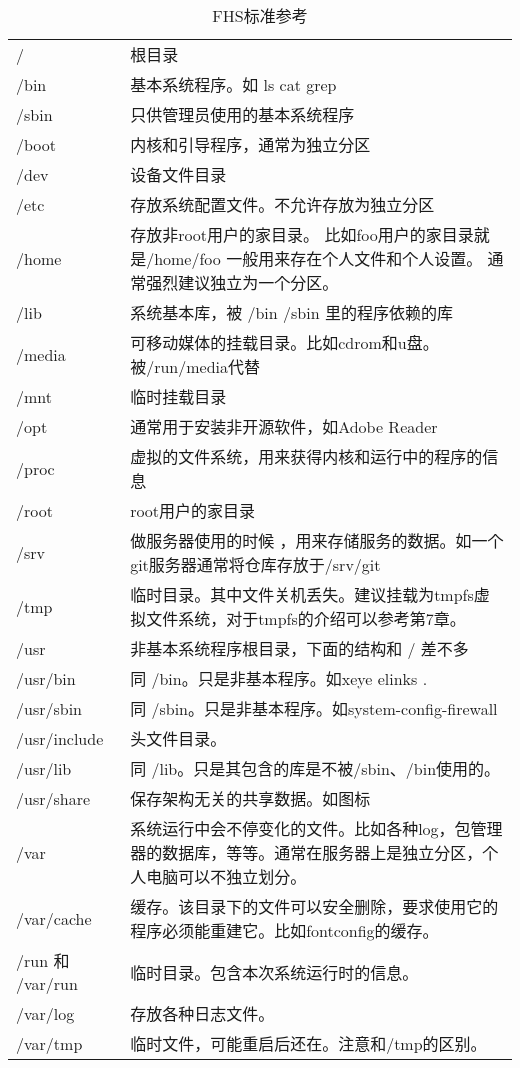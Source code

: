 \documentclass[amstex,twoside]{ctexbook}
\begin{document}
\begin{longtable}{|l|p{}|}\hline
\caption{FHS标准参考}\\
\hline
/ & 根目录 \\\hline
/bin & 基本系统程序。如 ls cat grep \\\hline
/sbin & 只供管理员使用的基本系统程序 \\\hline
/boot & 内核和引导程序，通常为独立分区\\\hline
/dev & 设备文件目录 \\\hline
/etc & 存放系统配置文件。不允许存放为独立分区\\\hline
/home & 存放非root用户的家目录。 
比如foo用户的家目录就是/home/foo
一般用来存在个人文件和个人设置。
通常强烈建议独立为一个分区。\\\hline
/lib & 系统基本库，被 /bin /sbin 里的程序依赖的库 \\\hline
/media & 可移动媒体的挂载目录。比如cdrom和u盘。被/run/media代替\\\hline
/mnt & 临时挂载目录\\\hline
/opt & 通常用于安装非开源软件，如Adobe Reader \\\hline
/proc & 虚拟的文件系统，用来获得内核和运行中的程序的信息\\\hline
/root & root用户的家目录\\\hline
/srv & 做服务器使用的时候 ，用来存储服务的数据。如一个git服务器通常将仓库存放于/srv/git\\\hline
/tmp & 临时目录。其中文件关机丢失。建议挂载为tmpfs虚拟文件系统，对于tmpfs的介绍可以参考第7章。 \\\hline
/usr & 非基本系统程序根目录，下面的结构和 / 差不多 \\\hline
/usr/bin & 同 /bin。只是非基本程序。如xeye  elinks . \\\hline
/usr/sbin & 同 /sbin。只是非基本程序。如system-config-firewall \\\hline
/usr/include & 头文件目录。\\\hline
/usr/lib & 同 /lib。只是其包含的库是不被/sbin、/bin使用的。\\\hline
/usr/share &  保存架构无关的共享数据。如图标\\\hline
/var & 系统运行中会不停变化的文件。比如各种log，包管理器的数据库，等等。通常在服务器上是独立分区，个人电脑可以不独立划分。\\\hline
/var/cache & 缓存。该目录下的文件可以安全删除，要求使用它的程序必须能重建它。比如fontconfig的缓存。\\\hline
/run 和 /var/run & 临时目录。包含本次系统运行时的信息。\\\hline
/var/log & 存放各种日志文件。\\\hline
/var/tmp & 临时文件，可能重启后还在。注意和/tmp的区别。\\\hline
\end{longtable}
\end{document}
